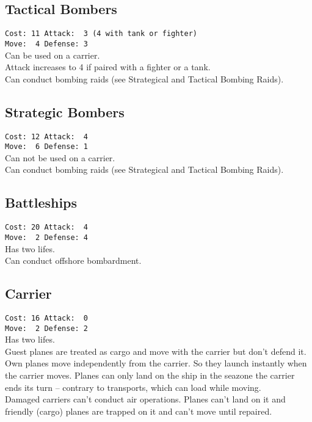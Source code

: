 \documentclass[10pt,twoside]{article}
\begin{document}
\begin{multicols*}{3}
\subsection*{Tactical Bombers}
\texttt{Cost: 11 \quad Attack: ~3 {\scriptsize(4 with tank or fighter)} \\ Move: ~4 \quad Defense: 3 \\ }
Can be used on a carrier.\\
Attack increases to 4 if paired with a fighter or a tank.\\
Can conduct bombing raids (see \glqq Strategical and Tactical Bombing Raids\grqq).

\subsection*{Strategic Bombers}
\texttt{Cost: 12 \quad\quad\quad Attack: ~4 \\ Move: ~6 \quad\quad\quad Defense: 1 \\ }
Can not be used on a carrier.\\
Can conduct bombing raids (see \glqq Strategical and Tactical Bombing Raids\grqq).


\subsection*{Battleships}
\texttt{Cost: 20 \quad\quad\quad Attack: ~4 \\ Move: ~2 \quad\quad\quad Defense: 4 \\ }
Has two lifes.\\
Can conduct offshore bombardment.

\subsection*{Carrier}
\texttt{Cost: 16 \quad\quad\quad Attack: ~0 \\ Move: ~2 \quad\quad\quad Defense: 2 \\ }
Has two lifes.\\
Guest planes are treated as cargo and move with the carrier but don't defend it. Own planes move independently from the carrier. So they launch instantly when the carrier moves. Planes can only land on the ship in the seazone the carrier ends its turn -- contrary to transports, which can load while moving.\\
Damaged carriers can't conduct air operations. Planes can't land on it and friendly (cargo) planes are trapped on it and can't move until repaired.


\end{multicols*}
\end{document}

